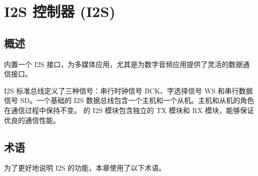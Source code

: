 \documentclass[main\_\_CN.tex]{subfiles}
\begin{document}

\ifglobal
\else
    {\let\clearpage\relax \listoftodos}
    {\let\clearpage\relax \listofdonetodos}
    \tableofcontents
\fi



\hypertarget{i2s}{}
\chapter{I2S 控制器 (I2S)}
\label{mod:i2s}

\section{概述}

\chipname{} 内置一个 I2S 接口，为多媒体应用，尤其是为数字音频应用提供了灵活的数据通信接口。

I2S 标准总线定义了三种信号：串行时钟信号 BCK、字选择信号 WS 和串行数据信号 SD。一个基础的 I2S 数据总线包含一个主机和一个从机。主机和从机的角色在通信过程中保持不变。\chipname{} 的 I2S 模块包含独立的 TX 模块和 RX 模块，能够保证优良的通信性能。

\section{术语}

为了更好地说明 I2S 的功能，本章使用了以下术语。 
\end{document}
